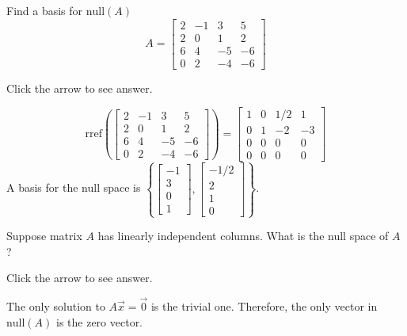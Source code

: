 \documentclass{ximera}
\begin{document}
\begin{problem}\label{prb:5.38} Find a basis for $\mbox{null} \left(A \right)$
$$ A = \left[ \begin{array}{rrrr}
2 & -1 & 3 & 5 \\
2 & 0 & 1 & 2 \\
6 & 4 & -5 & -6 \\
0 & 2 & -4 & -6
\end{array} \right]$$

Click the arrow to see answer.

\begin{expandable}{}{}
 $$\text{rref}\left(\left[ \begin{array}{rrrr}
2 & -1 & 3 & 5 \\
2 & 0 & 1 & 2 \\
6 & 4 & -5 & -6 \\
0 & 2 & -4 & -6
\end{array} \right]\right)=
 \begin{bmatrix} 1 &0 &1/2 &1\\
 0 &1 &-2 &-3\\
 0& 0& 0& 0\\
 0& 0& 0& 0\end{bmatrix}
 $$  A basis for the null space is $\left\{\begin{bmatrix}
     -1\\3\\0\\1
 \end{bmatrix}, \begin{bmatrix}
     -1/2\\2\\1\\0
 \end{bmatrix}\right\}$.
\end{expandable}
\end{problem}

\begin{problem}\label{prob:nullZero}
Suppose matrix $A$ has linearly independent columns.  What is the null space of $A$?

Click the arrow to see answer.

\begin{expandable}{}{}
    The only solution to $A\vec{x}=\vec{0}$ is the trivial one.  Therefore, the only vector in $\text{null}(A)$ is the zero vector.
\end{expandable}
\end{problem}
\end{document}
